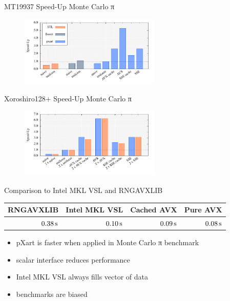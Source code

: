 \documentclass[aspectratio=169]{beamer}
\begin{document}
    \begin{frame}{MT19937 Speed-Up Monte Carlo π}
      \begin{figure}
        \includegraphics[width=0.6\textwidth]{figures/monte_carlo_pi_desktop_mt19937.pdf}\\
      \end{figure}
    \end{frame}

    \begin{frame}{Xoroshiro128+ Speed-Up Monte Carlo π}
      \begin{figure}
        \includegraphics[width=0.6\textwidth]{figures/monte_carlo_pi_desktop_xrsr128p.pdf}
      \end{figure}
    \end{frame}

    \begin{frame}{Comparison to Intel MKL VSL and RNGAVXLIB}
      \begin{table}
        \begin{tabular}{rrrr}
          \hline
          RNGAVXLIB & Intel MKL VSL & Cached AVX & Pure AVX \\
          \hline
          \hline
          $0.38\, \mathrm{s}$ & $0.10\, \mathrm{s}$ & $0.09\, \mathrm{s}$ & $0.08\, \mathrm{s}$ \\
          \hline
        \end{tabular}
      \end{table}
      \begin{itemize}
        \pause
        \item pXart is faster when applied in Monte Carlo π benchmark
        \pause
        \item scalar interface reduces performance
        \pause
        \item Intel MKL VSL always fills vector of data
        \pause
        \item benchmarks are biased
      \end{itemize}
    \end{frame}
\end{document}
